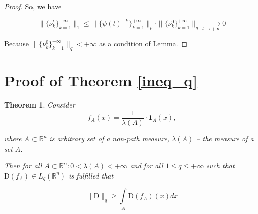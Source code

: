 \documentclass{article}
\newtheorem*{theorem-non}{Theorem}
\begin{document}
\begin{proof}
        So, we have 

        \begin{equation*}
            \|\{\nu_k^t\}_{k=1}^{+\infty}\|_1 \leq \|\{\psi(t)^{-k}\}_{k=1}^{+\infty}\|_p \cdot \|\{\nu_k^0\}_{k=1}^{+\infty}\|_q \underset{t \to +\infty}{\longrightarrow} 0
        \end{equation*}

        Because $\|\{\nu_k^0\}_{k=1}^{+\infty}\|_q < +\infty$ as a condition of Lemma.
        
    \end{proof}

    \section{Proof of Theorem \ref{ineq_q}} \label{pr_ineq_q}
        \begin{theorem-non}
            Consider 
            \begin{equation}\label{f_R_A}
                f_A(x) = \dfrac{1}{\lambda(A)} \cdot \textbf{1}_{A}(x),
            \end{equation}
    
            where $A \subset \mathbb{R}^n$ is arbitrary set of a non-path measure, $\lambda(A)$ -- the measure of a set $A$.
    
            Then for all $A \subset \mathbb{R}^n :  0 < \lambda(A) < +\infty$ and for all $1 \leq q \leq +\infty$ such that $\text{D}(f_A) \in L_q(\mathbb{R}^n)$ is fulfilled that  
    
            \begin{equation}\label{int_f_R_A}
                \|\text{D}\|_q \geq \int\limits_{A} \text{D}(f_A)(x)dx
            \end{equation}
        \end{theorem-non}
    
\end{document}
